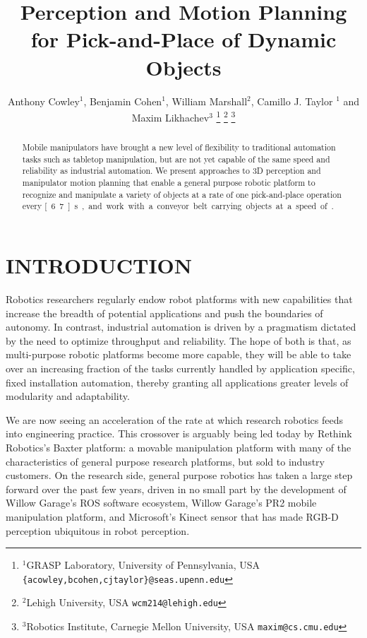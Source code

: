 \documentclass[letterpaper, 10 pt, conference]{ieeeconf}  %
\title{\LARGE \bf
Perception and Motion Planning for Pick-and-Place of Dynamic Objects
}
\author{Anthony Cowley$^1$, Benjamin Cohen$^1$, William Marshall$^2$, Camillo J. Taylor $^1$ and Maxim Likhachev$^3$%
\thanks{$^{1}$GRASP Laboratory, University of Pennsylvania, USA
        {\tt\small \{acowley,bcohen,cjtaylor\}@seas.upenn.edu}}
\thanks{$^2$Lehigh University, USA {\tt\small wcm214@lehigh.edu}}
\thanks{$^3$Robotics Institute, Carnegie Mellon University, USA {\tt\small maxim@cs.cmu.edu}}
}
\begin{document}
\maketitle
\thispagestyle{empty}
\pagestyle{empty}


\begin{abstract}
  Mobile manipulators have brought a new level of flexibility to
  traditional automation tasks such as tabletop manipulation, but are
  not yet capable of the same speed and reliability as industrial
  automation. We present approaches to 3D perception and manipulator
  motion planning that enable a general purpose robotic platform to
  recognize and manipulate a variety of objects at a rate of one
  pick-and-place operation every \unit[6.7]{s}, and work with a
  conveyor belt carrying objects at a speed of
  .
\end{abstract}


\section{INTRODUCTION}
Robotics researchers regularly endow robot platforms with new
capabilities that increase the breadth of potential applications and
push the boundaries of autonomy. In contrast, industrial automation is
driven by a pragmatism dictated by the need to optimize throughput and
reliability. The hope of both is that, as multi-purpose robotic
platforms become more capable, they will be able to take over an
increasing fraction of the tasks currently handled by application
specific, fixed installation automation, thereby granting all
applications greater levels of modularity and adaptability.

We are now seeing an acceleration of the rate at which research
robotics feeds into engineering practice. This crossover is arguably
being led today by Rethink Robotics's Baxter platform: a movable
manipulation platform with many of the characteristics of general
purpose research platforms, but sold to industry customers. On
the research side, general purpose robotics has taken a large step
forward over the past few years, driven in no small part by the
development of Willow Garage's ROS software ecosystem, Willow Garage's
PR2 mobile manipulation platform, and Microsoft's Kinect sensor that
has made RGB-D perception ubiquitous in robot perception.
\end{document}
